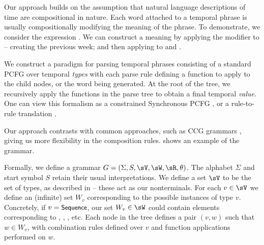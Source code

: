 Our approach builds on the assumption that natural language descriptions
	of time are compositional in nature.
Each word attached to a temporal phrase is 
	usually compositionally modifying the meaning of the phrase.
To demonstrate, we consider the expression .
We can construct a meaning by 
	applying the modifier  to  -- 
	creating the previous week;
	and then applying  to  and .

We construct a paradigm for parsing temporal phrases 
	consisting of a standard PCFG over temporal \textit{types} with each parse 
	rule defining a function to apply to the child nodes, or the word being
	generated.
At the root of the tree, we recursively apply the functions in the parse tree
	to obtain a final temporal \textit{value}.
One can view this formalism as a constrained Synchronous PCFG
	\cite{key:2001yamada-syntaxmt}, or a rule-to-rule translation
	\cite{key:1976bach-semantics}.

Our approach contrasts with common approaches, such as CCG grammars 
	\cite{key:2000steedman-ccg,key:2004bos-ccg,2011kwiatkowski-semantics},
	giving us more flexibility in the composition rules.
 shows an example of the grammar.

Formally, we define a grammar
	$G = \left(\Sigma,S,\sV,\sW,\sR,\theta\right)$.
The alphabet $\Sigma$ and start symbol $S$ retain their usual interpretations.
We define a set $\sV$ to be the set of types, as described in
	 -- these act as our nonterminals.
For each $v \in \sV$ we define an (infinite) set $W_v$ corresponding to the 
	possible instances of type $v$.
Concretely, if $v=\textsf{\small{Sequence}}$, our set $W_v \in \sW$ could contain elements
	corresponding to , , , etc.
Each node in the tree defines a pair $(v,w)$ such that $w \in W_v$,
	with combination rules defined over $v$ and function applications performed
	on $w$.

